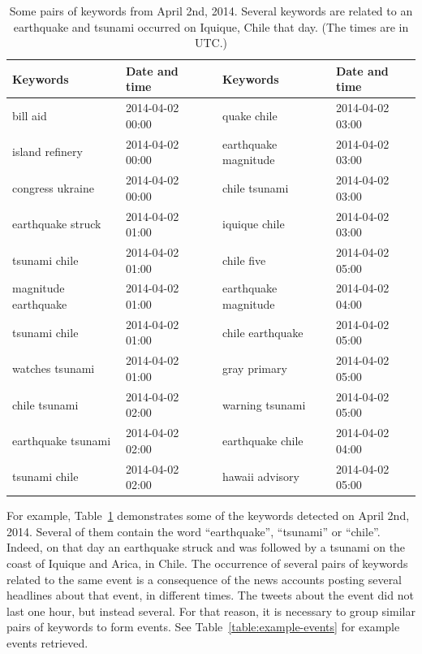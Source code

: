 \begin{table}

\begin{center}
\begin{tabular}{lllll}
\toprule
  Keywords              &  Date and time     &     &  Keywords              &  Date and time     \\
\midrule
 bill aid              &  2014-04-02 00:00  &     &  quake chile           &  2014-04-02 03:00  \\
 island refinery       &  2014-04-02 00:00  &     &  earthquake magnitude  &  2014-04-02 03:00  \\
 congress ukraine      &  2014-04-02 00:00  &     &  chile tsunami         &  2014-04-02 03:00  \\
 earthquake struck     &  2014-04-02 01:00  &     &  iquique chile         &  2014-04-02 03:00  \\
 tsunami chile         &  2014-04-02 01:00  &     &  chile five            &  2014-04-02 05:00  \\
 magnitude earthquake  &  2014-04-02 01:00  &     &  earthquake magnitude  &  2014-04-02 04:00  \\
 tsunami chile         &  2014-04-02 01:00  &     &  chile earthquake      &  2014-04-02 05:00  \\
 watches tsunami       &  2014-04-02 01:00  &     &  gray primary          &  2014-04-02 05:00  \\
 chile tsunami         &  2014-04-02 02:00  &     &  warning tsunami       &  2014-04-02 05:00  \\
 earthquake tsunami    &  2014-04-02 02:00  &     &  earthquake chile      &  2014-04-02 04:00  \\
 tsunami chile         &  2014-04-02 02:00  &     &  hawaii advisory       &  2014-04-02 05:00  \\
\bottomrule
\end{tabular}
\end{center}
\caption[Example pairs of keywords from April 2nd, 2014.]{Some pairs of
  keywords from April 2nd, 2014. Several keywords are related to an
  earthquake and tsunami occurred on Iquique, Chile that day. (The
  times are in UTC.)}\label{table:example-pairs}
\end{table}


For example, Table~\ref{table:example-pairs} demonstrates some of the keywords
detected on April 2nd, 2014. 
%
Several of them contain the word ``earthquake'', ``tsunami'' or ``chile''.
%
Indeed, on that day an earthquake struck and was followed by a tsunami on the
coast of Iquique and Arica, in Chile. 
%
The occurrence of several pairs of keywords related to the same event is a
consequence of the news accounts posting several headlines about that event, in
different times. 
%
The tweets about the event did not last one hour, but instead several. 
%
For that reason, it is necessary to group similar pairs of keywords to form
events.
%
See Table~\ref{table:example-events} for example events retrieved.


